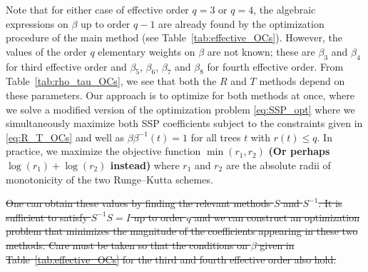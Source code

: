 Note that for either case of effective order $q=3$ or $q=4$, the algebraic expressions on 
$\beta$ up to order $q-1$ are already found by the optimization procedure of 
the main method (see Table~\ref{tab:effective_OCs}). 
However, the values of the order $q$ elementary weights on $\beta$ are not known; these 
are $\beta_3$ and $\beta_4$ for third effective order and
$\beta_5$, $\beta_6$, $\beta_7$ and $\beta_8$ for fourth
effective order.
From Table~\ref{tab:rho_tau_OCs}, we see that both the $R$ and $T$
methods depend on these parameters.
Our approach is to optimize for both methods at once, where we solve a
modified version of the optimization problem \eqref{eq:SSP_opt} where
we simultaneously maximize both SSP coefficients subject to the
constraints given in \eqref{eq:R_T_OCs} and well as
$\beta\beta^{-1}(t) = 1$ for all trees $t$ with $r(t) \le q$.
In practice, we maximize the objective function $\min(r_1,r_2)$
\textbf{(Or perhaps $\log(r_1) + \log(r_2)$ instead)}
where $r_1$ and $r_2$ are the absolute radii of monotonicity of the
two Runge--Kutta schemes.


\sout{
One can obtain these values by finding the relevant methods $S$ and $S^{-1}$. 
It is sufficient to satisfy $S^{-1}S = I$ up to order $q$ and we can construct an optimization 
problem that minimizes the magnitude of the coefficients appearing in these two methods.
Care must be taken so that the conditions on $\beta$ given in Table~\ref{tab:effective_OCs} for the third and fourth effective order also hold. 
}

